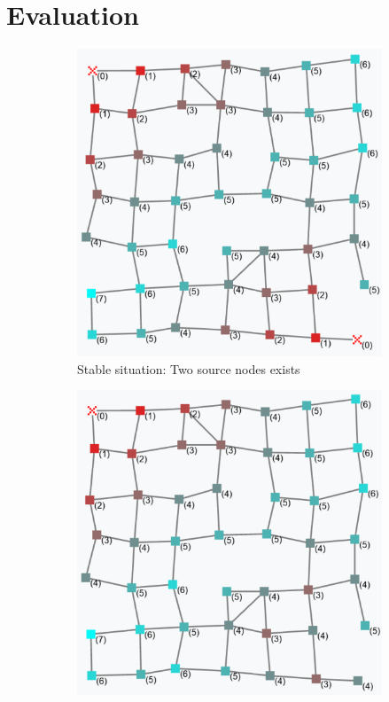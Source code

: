 \documentclass[conference]{IEEEtran}
\begin{document}
\section{Evaluation}\label{evaluation}
\begin{figure}[h]
  \centering
  \begin{subfigure}[b]{0.32\textwidth}
      \centering
      \includegraphics[width=\textwidth]{img/hop-count-1.png}
      \caption{Stable situation: Two source nodes exists}
  \end{subfigure}
  \hfill
  \begin{subfigure}[b]{0.32\textwidth}
      \centering
      \includegraphics[width=\textwidth]{img/hop-count-2.png}

\end{subfigure}
\end{figure}
\end{document}
